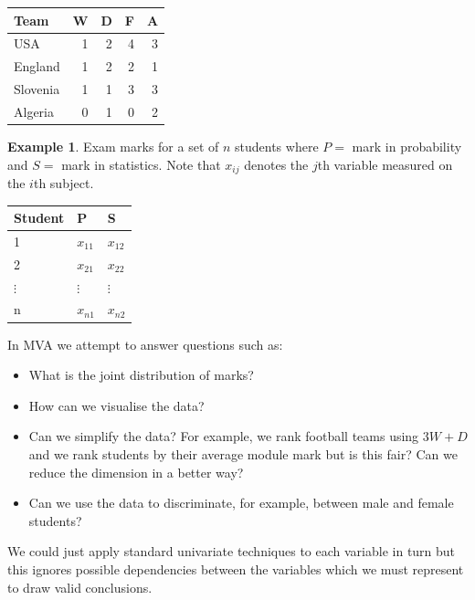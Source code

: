\documentclass[]{book}
\providecommand{\tightlist}{%
  \setlength{\itemsep}{0pt}\setlength{\parskip}{0pt}}
\theoremstyle{definition}
\theoremstyle{definition}
\newtheorem{example}{Example}[chapter]
\theoremstyle{definition}
\theoremstyle{remark}
\begin{document}
\begin{table}[H]
\centering
\begin{tabular}{lrrrr}
\toprule
Team & W & D & F & A\\
\midrule
USA & 1 & 2 & 4 & 3\\
England & 1 & 2 & 2 & 1\\
Slovenia & 1 & 1 & 3 & 3\\
Algeria & 0 & 1 & 0 & 2\\
\bottomrule
\end{tabular}
\end{table}

\begin{example}
\protect\hypertarget{exm:unnamed-chunk-3}{}{\label{exm:unnamed-chunk-3} }Exam marks for a set of \(n\) students where \(P =\) mark in probability and \(S =\) mark in statistics.
Note that \(x_{ij}\) denotes the \(j\)th variable measured on the \(i\)th subject.
\end{example}

\begin{table}[H]
\centering
\begin{tabular}{lll}
\toprule
Student & P & S\\
\midrule
1 & $x_{11}$ & $x_{12}$\\
2 & $x_{21}$ & $x_{22}$\\
$\vdots$ & $\vdots$ & $\vdots$\\
n & $x_{n1}$ & $x_{n2}$\\
\bottomrule
\end{tabular}
\end{table}

In MVA we attempt to answer questions such as:

\begin{itemize}
\tightlist
\item
  What is the joint distribution of marks?
\item
  How can we visualise the data?
\item
  Can we simplify the data? For example, we rank football teams using \(3W+D\) and we rank students by their average module mark but is this fair? Can we reduce the dimension in a better way?
\item
  Can we use the data to discriminate, for example, between male and female students?
\end{itemize}

We could just apply standard univariate techniques to each variable in turn but this ignores possible dependencies between the variables which we must represent to draw valid conclusions.
\end{document}
